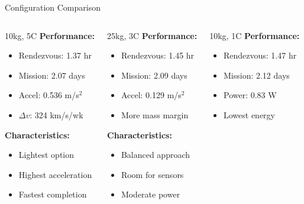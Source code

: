 \documentclass[aspectratio=169]{beamer}
\begin{document}
\begin{frame}{Configuration Comparison}
\begin{columns}[t]
\begin{block}{10kg, 5C}
\textbf{Performance:}
\begin{itemize}
    \item Rendezvous: 1.37 hr
    \item Mission: 2.07 days
    \item Accel: 0.536 m/s$^2$
    \item $\Delta v$: 324 km/s/wk
\end{itemize}

\textbf{Characteristics:}
\begin{itemize}
    \item Lightest option
    \item Highest acceleration
    \item Fastest completion
\end{itemize}
\end{block}

\begin{block}{25kg, 3C}
\textbf{Performance:}
\begin{itemize}
    \item Rendezvous: 1.45 hr
    \item Mission: 2.09 days
    \item Accel: 0.129 m/s$^2$
    \item More mass margin
\end{itemize}

\textbf{Characteristics:}
\begin{itemize}
    \item Balanced approach
    \item Room for sensors
    \item Moderate power
\end{itemize}
\end{block}

\begin{block}{10kg, 1C}
\textbf{Performance:}
\begin{itemize}
    \item Rendezvous: 1.47 hr
    \item Mission: 2.12 days
    \item Power: 0.83 W
    \item Lowest energy
\end{itemize}


\end{block}
\end{columns}
\end{frame}
\end{document}
